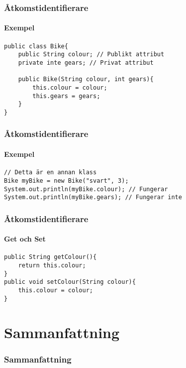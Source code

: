 \documentclass[aspectratio=169]{beamer}
\begin{document}
\begin{frame}[fragile]
    \frametitle{Åtkomstidentifierare}
    \framesubtitle{Exempel}

    \begin{lstlisting}
public class Bike{
    public String colour; // Publikt attribut
    private inte gears; // Privat attribut

    public Bike(String colour, int gears){
        this.colour = colour;
        this.gears = gears;
    }
}
    \end{lstlisting}

\end{frame}

\begin{frame}[fragile]
    \frametitle{Åtkomstidentifierare}
    \framesubtitle{Exempel}

    \begin{lstlisting}
// Detta är en annan klass
Bike myBike = new Bike("svart", 3);
System.out.println(myBike.colour); // Fungerar
System.out.println(myBike.gears); // Fungerar inte
    \end{lstlisting}

\end{frame}

\begin{frame}[fragile]
    \frametitle{Åtkomstidentifierare}
    \framesubtitle{Get och Set}


    \begin{lstlisting}
public String getColour(){
    return this.colour;
}
public void setColour(String colour){
    this.colour = colour;
}
    \end{lstlisting}

\end{frame}

\section{Sammanfattning}

\begin{frame}[fragile]
    \frametitle{Sammanfattning}







\end{frame}
\end{document}
